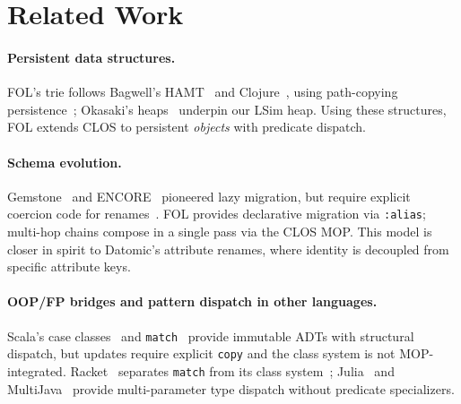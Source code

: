 \documentclass[sigconf,nonacm]{acmart}
\begin{document}
\section{Related Work}
\label{sec:related}

\paragraph{Persistent data structures.}
FOL's trie follows Bagwell's HAMT~\cite{Bagwell2000} and Clojure~\cite{Hickey2008}, using path-copying persistence~\cite{Driscoll1989}; Okasaki's heaps~\cite{Okasaki1998} underpin our LSim heap.
Using these structures, FOL extends CLOS to persistent \emph{objects} with predicate dispatch.

\paragraph{Schema evolution.}
Gemstone~\cite{Penney1987} and ENCORE~\cite{Skarra1986} pioneered lazy migration, but require explicit coercion code for renames~\cite{Morrison1991}.
FOL provides declarative migration via \texttt{:alias}; multi-hop chains compose in a single pass via the CLOS MOP.
This model is closer in spirit to Datomic's attribute renames, where identity is decoupled from specific attribute keys.

\paragraph{OOP/FP bridges and pattern dispatch in other languages.}
Scala's case classes~\cite{Odersky2016} and \texttt{match}~\cite{Emir2007} provide immutable ADTs with structural dispatch, but updates require explicit \texttt{copy} and the class system is not MOP-integrated.
Racket~\cite{flatt:manifesto} separates \texttt{match} from its class system~\cite{Flatt2006}; Julia~\cite{Bezanson2017} and MultiJava~\cite{Clifton2000} provide multi-parameter type dispatch without predicate specializers.
\end{document}
